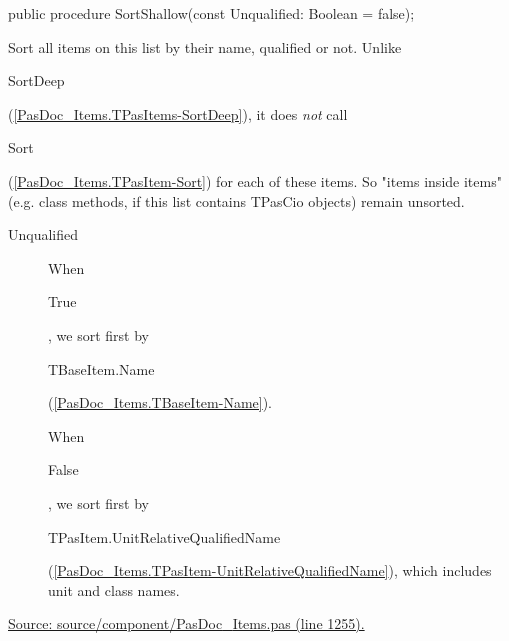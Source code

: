 \documentclass{report}
\newif\ifpdf
\begin{document}
\label{PasDoc_Items.TPasItems-SortShallow}
\begin{list}{}{
\setlength{\itemindent}{0cm}
\setlength{\listparindent}{0cm}
\setlength{\leftmargin}{\evensidemargin}
\addtolength{\leftmargin}{\tmplength}
\settowidth{\labelsep}{X}
\addtolength{\leftmargin}{\labelsep}
\setlength{\labelwidth}{\tmplength}
}
\item[\textbf{Declaration}\hfill]
\ifpdf
\begin{flushleft}
\fi
\begin{ttfamily}
public procedure SortShallow(const Unqualified: Boolean = false);\end{ttfamily}

\ifpdf
\end{flushleft}
\fi

\par
\item[\textbf{Description}]
Sort all items on this list by their name, qualified or not. Unlike \begin{ttfamily}SortDeep\end{ttfamily}(\ref{PasDoc_Items.TPasItems-SortDeep}), it does \textit{not} call \begin{ttfamily}Sort\end{ttfamily}(\ref{PasDoc_Items.TPasItem-Sort}) for each of these items. So "items inside items" (e.g. class methods, if this list contains TPasCio objects) remain unsorted.

\par
\item[\textbf{Parameters}]
\begin{description}
\item[Unqualified] When \begin{ttfamily}True\end{ttfamily}, we sort first by \begin{ttfamily}TBaseItem.Name\end{ttfamily}(\ref{PasDoc_Items.TBaseItem-Name}).

When \begin{ttfamily}False\end{ttfamily}, we sort first by \begin{ttfamily}TPasItem.UnitRelativeQualifiedName\end{ttfamily}(\ref{PasDoc_Items.TPasItem-UnitRelativeQualifiedName}), which includes unit and class names.
\end{description}
\par
\href{https://github.com/pasdoc/pasdoc/blob/master/source/component/PasDoc_Items.pas#L1255}{Source: source/component/PasDoc{\_}Items.pas (line 1255).}

\end{list}
\end{document}
